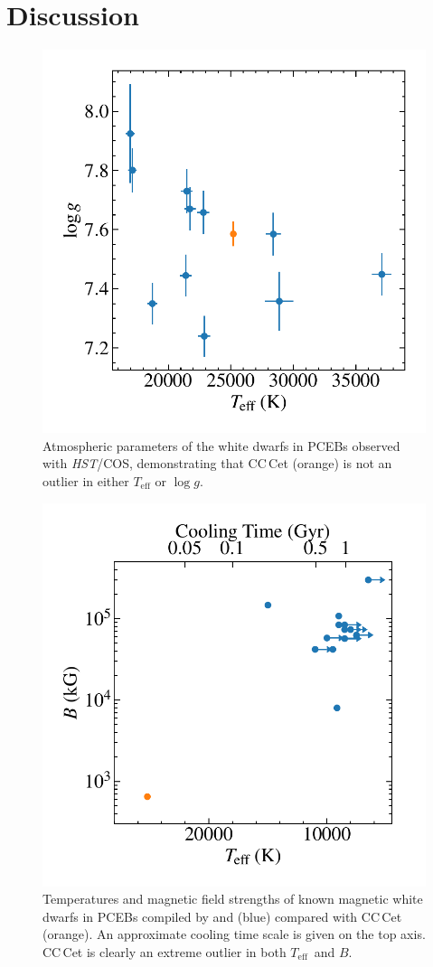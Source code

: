 \documentclass[fleqn,usenatbib]{mnras}
\newcommand{\Teff}{\mbox{$T_{\mathrm{eff}}$}}
\begin{document}
\section{Discussion}
\label{sec:dis}


\begin{figure}
    \centering
    \includegraphics[width=8 cm]{teffvlogg.pdf}
    \caption{Atmospheric parameters of the white dwarfs in PCEBs observed with \textit{HST}/COS, demonstrating that CC\,Cet (orange) is not an outlier in either $T_{\mathrm{eff}}$ or $\log g$.}
    \label{fig:tefflogg}
\end{figure}

\begin{figure}
    \centering
    \includegraphics[width=8 cm]{teffvB.pdf}
    \caption{Temperatures and magnetic field strengths of known magnetic white dwarfs in PCEBs compiled by \citet{ferrarioetal15-1} and \citet{parsonsetal21-1} (blue) compared with CC\,Cet (orange). An approximate cooling time scale is given on the top axis. CC\,Cet is clearly an extreme outlier in both \Teff\ and $B$.}
    \label{fig:teffB}
\end{figure}
\end{document}
